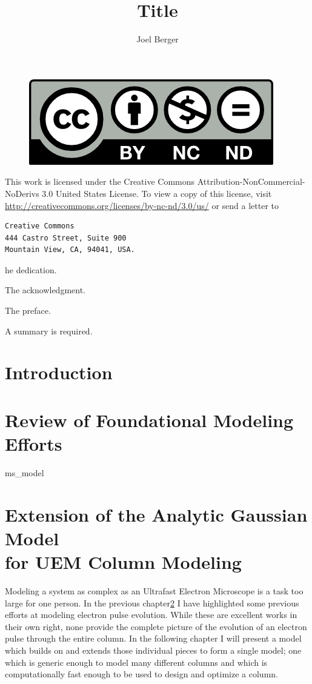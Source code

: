 \documentclass{uicthesi}
\title{Title}
\author{Joel Berger}
\begin{document}
\maketitle

\newpage
\begin{figure}
  \centering
  \includegraphics{by-nc-nd}
\end{figure}
This work is licensed under the Creative Commons Attribution-NonCommercial-NoDerivs 3.0 United States License.
To view a copy of this license, visit \url{http://creativecommons.org/licenses/by-nc-nd/3.0/us/} or send a letter to
\begin{verbatim}
Creative Commons
444 Castro Street, Suite 900
Mountain View, CA, 94041, USA.
\end{verbatim}


\dedication
The dedication.
 
\acknowledgment
The acknowledgment.
 
\preface
The preface.
 
\tableofcontents
\listoftables
\listoffigures
 

 
\summary
A summary is required.

\chapter{Introduction}

\chapter{Review of Foundational Modeling Efforts} \label{chap:previous_models}

  {ms_model}

\chapter{Extension of the Analytic Gaussian Model\\for UEM Column Modeling}

Modeling a system as complex as an Ultrafast Electron Microscope is a task too large for one person.
In the previous chapter\ref{chap:previous_models} I have highlighted some previous efforts at modeling electron pulse evolution.
While these are excellent works in their own right, none provide the complete picture of the evolution of an electron pulse through the entire column.
In the following chapter I will present a model which builds on and extends those individual pieces to form a single model; one which is generic enough to model many different columns and which is computationally fast enough to be used to design and optimize a column.
\end{document}
